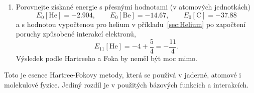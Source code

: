 \begin{enumerate}
    \item Porovnejte získané energie s přesnými hodnotami (v atomových jednotkách)
        \begin{equation*}
            E_{0}[\text{He}]=-2.904,\qquad
            E_{0}[\text{Be}]=-14.67,\qquad
            E_{0}[\text{C}]=-37.88
        \end{equation*}
        a s hodnotou vypočtenou pro helium v příkladu~\ref{sec:Helium} po započtení poruchy způsobené interakcí elektronů,
        \begin{equation*}
            E_{11}[\text{He}]=-4+\frac{5}{4}=-\frac{11}{4}.
        \end{equation*}
        Výsledek podle Hartreeho a Foka by neměl být moc mimo.
    \end{enumerate}

    Toto je esence Hartree-Fokovy metody, která se používá v jaderné, atomové i molekulové fyzice.
    Jediný rozdíl je v použitých bázových funkcích a interakcích.

